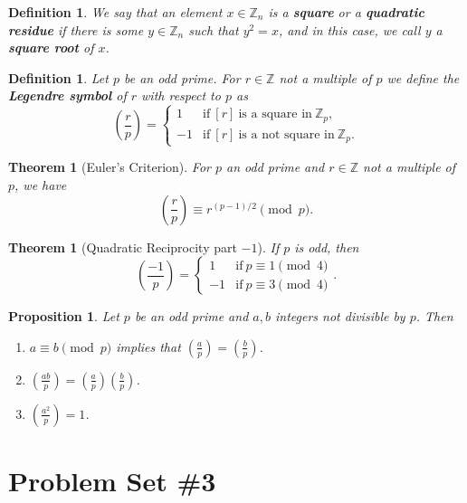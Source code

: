 \documentclass[12pt]{amsart}
\newcommand{\Z}{\mathbb{Z}}
\numberwithin{equation}{section}
\theoremstyle{plain} %
\newtheorem{thm}	[section]	{Theorem}
\newtheorem{prop}	[section]	{Proposition}
\newtheorem{defn}	[section]	{Definition}
\begin{document}
\begin{defn}
We say that an element $x\in \Z_n$ is a \textbf{square} or a \textbf{quadratic residue} if there is some $y\in \Z_n$ such that $y^2=x$, and in this case, we call $y$ a \textbf{square root} of $x$. 
\end{defn}

\begin{defn} Let $p$ be an odd prime. For $r\in \Z$ not a multiple of $p$ we define the \textbf{Legendre symbol}  of $r$ with respect to $p$ as 
\[ \left( \frac{r}{p} \right) = \begin{cases} 1 & \text{if} \ [r] \ \text{is a square in} \ \Z_p, \\ -1 & \text{if} \ [r] \ \text{is a not square in} \ \Z_p. \end{cases}\]
\end{defn}


\begin{thm}[Euler's Criterion] 
 For $p$ an odd prime and $r\in \Z$ not a multiple of $p$, we have
\[\displaystyle \left( \frac{r}{p} \right) \equiv r^{(p-1)/2} \pmod p.\]
\end{thm}



\begin{thm}[Quadratic Reciprocity part $-1$] If $p$ is odd, then
\[ \left( \frac{-1}{p} \right) = \begin{cases} 1 &\text{if} \ p\equiv 1 \pmod 4\\ -1 &\text{if} \ p\equiv 3 \pmod 4\end{cases}.\]
\end{thm}


\begin{prop} Let $p$ be an odd prime and $a,b$ integers not divisible by $p$. Then
\begin{enumerate}
\item $\displaystyle a\equiv b \pmod{p}$ implies that $\displaystyle \left(\frac{a}{p}\right) = \left(\frac{b}{p}\right)$.
\item $\displaystyle\left(\frac{ab}{p}\right) = \left(\frac{a}{p}\right) \left(\frac{b}{p}\right)$.
\item $\displaystyle\left(\frac{a^2}{p}\right) = 1$.
\end{enumerate}
\end{prop}


\section*{Problem Set \#3}
\end{document}
